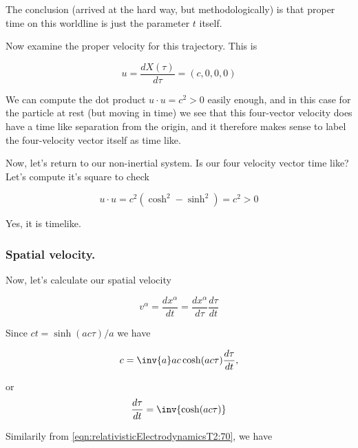 The conclusion (arrived at the hard way, but methodologically) is that proper time on this worldline is just the parameter $t$ itself.

Now examine the proper velocity for this trajectory.  This is

\begin{equation}\label{eqn:relativisticElectrodynamicsT2:72}
u = \frac{dX(\tau)}{d\tau} = (c, 0, 0, 0)
\end{equation}

We can compute the dot product $u \cdot u = c^2 > 0$ easily enough, and in this case for the particle at rest (but moving in time) we see that this four-vector velocity does have a time like separation from the origin, and it therefore makes sense to label the four-velocity vector itself as time like.

Now, let's return to our non-inertial system.  Is our four velocity vector time like?  Let's compute it's square to check

\begin{equation}\label{eqn:relativisticElectrodynamicsT2:90}
u \cdot u = c^2 ( \cosh^2 - \sinh^2 ) = c^2 > 0
\end{equation}

Yes, it is timelike.

\subsubsection{Spatial velocity.}

Now, let's calculate our spatial velocity

\begin{equation}\label{eqn:relativisticElectrodynamicsT2:100}
v^\alpha
= \frac{dx^\alpha}{dt}
=
\frac{dx^\alpha}{d\tau} \frac{d\tau}{dt}
\end{equation}

Since $ct = \sinh( a c \tau )/a$ we have

\begin{equation}\label{eqn:relativisticElectrodynamicsT2:110}
c = \inv{a} a c \cosh( a c \tau ) \frac{d\tau}{dt},
\end{equation}

or
\begin{equation}\label{eqn:relativisticElectrodynamicsT2:110b}
\frac{d\tau}{dt} = \inv{\cosh( a c \tau) }
\end{equation}

Similarily from \ref{eqn:relativisticElectrodynamicsT2:70}, we have

